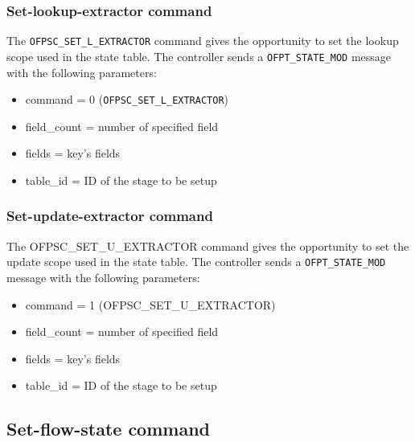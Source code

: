 
\subsubsection{Set-lookup-extractor command}
\label{subsec:set_l_extr}

The \texttt{OFPSC\_SET\_L\_EXTRACTOR} command gives the opportunity to set the lookup scope used in the state table.
The controller sends a \texttt{OFPT\_STATE\_MOD} message with the following parameters:

\begin{itemize}
\item command = 0 (\texttt{OFPSC\_SET\_L\_EXTRACTOR})
\item field\_count = number of specified field 
\item fields = key’s fields
\item table\_id = ID of the stage to be setup
\end{itemize}


\subsubsection{Set-update-extractor command}
\label{subsec:set_u_extr}

The OFPSC\_SET\_U\_EXTRACTOR command gives the opportunity to set the update scope used in the state table.
The controller sends a \texttt{OFPT\_STATE\_MOD} message with the following parameters:

\begin{itemize}
\item command = 1 (OFPSC\_SET\_U\_EXTRACTOR)
\item field\_count = number of specified field 
\item fields = key’s fields
\item table\_id = ID of the stage to be setup
\end{itemize}



\subsection{Set-flow-state command}
\label{subsec:add_flow}

